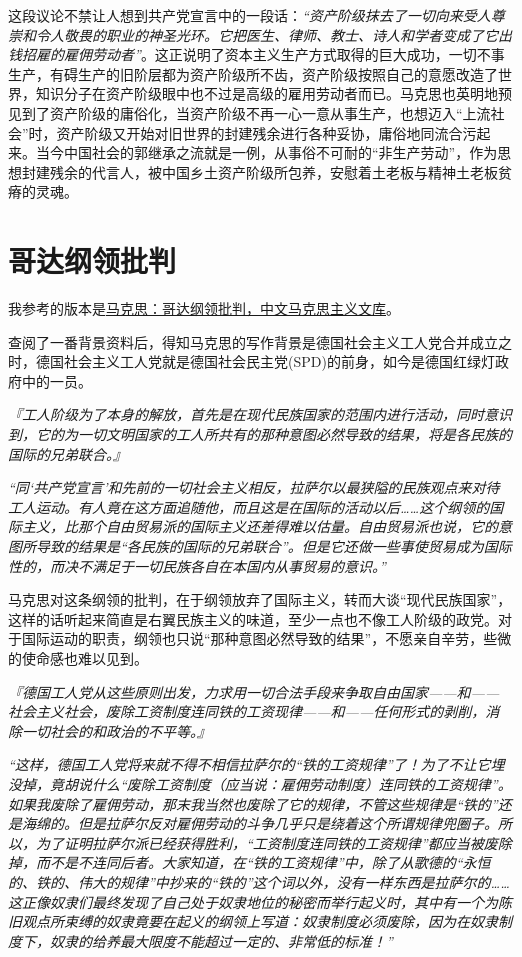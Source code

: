 \documentclass[a4paper]{article}
\begin{document}
这段议论不禁让人想到共产党宣言中的一段话：\emph{“资产阶级抹去了一切向来受人尊崇和令人敬畏的职业的神圣光环。它把医生、律师、教士、诗人和学者变成了它出钱招雇的雇佣劳动者”}。这正说明了资本主义生产方式取得的巨大成功，一切不事生产，有碍生产的旧阶层都为资产阶级所不齿，资产阶级按照自己的意愿改造了世界，知识分子在资产阶级眼中也不过是高级的雇用劳动者而已。马克思也英明地预见到了资产阶级的庸俗化，当资产阶级不再一心一意从事生产，也想迈入“上流社会”时，资产阶级又开始对旧世界的封建残余进行各种妥协，庸俗地同流合污起来。当今中国社会的郭继承之流就是一例，从事俗不可耐的“非生产劳动”，作为思想封建残余的代言人，被中国乡土资产阶级所包养，安慰着土老板与精神土老板贫瘠的灵魂。
\section{哥达纲领批判}
我参考的版本是\href{https://www.marxists.org/chinese/marx/marxist.org-chinese-marx-1875-4.htm}{马克思：哥达纲领批判，中文马克思主义文库}。

查阅了一番背景资料后，得知马克思的写作背景是德国社会主义工人党合并成立之时，德国社会主义工人党就是德国社会民主党(SPD)的前身，如今是德国红绿灯政府中的一员。

\emph{『工人阶级为了本身的解放，首先是在现代民族国家的范围内进行活动，同时意识到，它的为一切文明国家的工人所共有的那种意图必然导致的结果，将是各民族的国际的兄弟联合。』}

\emph{“同‘共产党宣言’和先前的一切社会主义相反，拉萨尔以最狭隘的民族观点来对待工人运动。有人竟在这方面追随他，而且这是在国际的活动以后……这个纲领的国际主义，比那个自由贸易派的国际主义还差得难以估量。自由贸易派也说，它的意图所导致的结果是“各民族的国际的兄弟联合”。但是它还做一些事使贸易成为国际性的，而决不满足于一切民族各自在本国内从事贸易的意识。”}

马克思对这条纲领的批判，在于纲领放弃了国际主义，转而大谈“现代民族国家”，这样的话听起来简直是右翼民族主义的味道，至少一点也不像工人阶级的政党。对于国际运动的职责，纲领也只说“那种意图必然导致的结果”，不愿亲自辛劳，些微的使命感也难以见到。

\emph{『德国工人党从这些原则出发，力求用一切合法手段来争取自由国家——和——社会主义社会，废除工资制度连同铁的工资现律——和——任何形式的剥削，消除一切社会的和政治的不平等。』}

\emph{“这样，德国工人党将来就不得不相信拉萨尔的“铁的工资规律”了！为了不让它埋没掉，竟胡说什么“废除工资制度（应当说：雇佣劳动制度）连同铁的工资规律”。如果我废除了雇佣劳动，那末我当然也废除了它的规律，不管这些规律是“铁的”还是海绵的。但是拉萨尔反对雇佣劳动的斗争几乎只是绕着这个所谓规律兜圈子。所以，为了证明拉萨尔派已经获得胜利，“工资制度连同铁的工资规律”都应当被废除掉，而不是不连同后者。大家知道，在“铁的工资规律”中，除了从歌德的“永恒的、铁的、伟大的规律”中抄来的“铁的”这个词以外，没有一样东西是拉萨尔的……这正像奴隶们最终发现了自己处于奴隶地位的秘密而举行起义时，其中有一个为陈旧观点所束缚的奴隶竟要在起义的纲领上写道：奴隶制度必须废除，因为在奴隶制度下，奴隶的给养最大限度不能超过一定的、非常低的标准！”}
\end{document}
